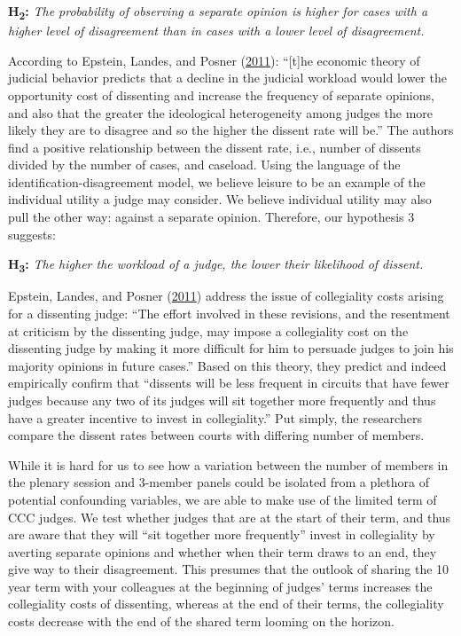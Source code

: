 \documentclass[
  11pt,
]{article}
\begin{document}
\textbf{H\textsubscript{2}:} \emph{The probability of observing a
separate opinion is higher for cases with a higher level of disagreement
than in cases with a lower level of disagreement.}

According to Epstein, Landes, and Posner
(\protect\hyperlink{ref-epsteinWhyWhenJudges2011}{2011}): ``{[}t{]}he
economic theory of judicial behavior predicts that a decline in the
judicial workload would lower the opportunity cost of dissenting and
increase the frequency of separate opinions, and also that the greater
the ideological heterogeneity among judges the more likely they are to
disagree and so the higher the dissent rate will be.'' The authors find
a positive relationship between the dissent rate, i.e., number of
dissents divided by the number of cases, and caseload. Using the
language of the identification-disagreement model, we believe leisure to
be an example of the individual utility a judge may consider. We believe
individual utility may also pull the other way: against a separate
opinion. Therefore, our hypothesis 3 suggests:

\textbf{H\textsubscript{3}:} \emph{The higher the workload of a judge,
the lower their likelihood of dissent.}

Epstein, Landes, and Posner
(\protect\hyperlink{ref-epsteinWhyWhenJudges2011}{2011}) address the
issue of collegiality costs arising for a dissenting judge: ``The effort
involved in these revisions, and the resentment at criticism by the
dissenting judge, may impose a collegiality cost on the dissenting judge
by making it more difficult for him to persuade judges to join his
majority opinions in future cases.'' Based on this theory, they predict
and indeed empirically confirm that ``dissents will be less frequent in
circuits that have fewer judges because any two of its judges will sit
together more frequently and thus have a greater incentive to invest in
collegiality.'' Put simply, the researchers compare the dissent rates
between courts with differing number of members.

While it is hard for us to see how a variation between the number of
members in the plenary session and 3-member panels could be isolated
from a plethora of potential confounding variables, we are able to make
use of the limited term of CCC judges. We test whether judges that are
at the start of their term, and thus are aware that they will ``sit
together more frequently'' invest in collegiality by averting separate
opinions and whether when their term draws to an end, they give way to
their disagreement. This presumes that the outlook of sharing the 10
year term with your colleagues at the beginning of judges' terms
increases the collegiality costs of dissenting, whereas at the end of
their terms, the collegiality costs decrease with the end of the shared
term looming on the horizon.
\end{document}
